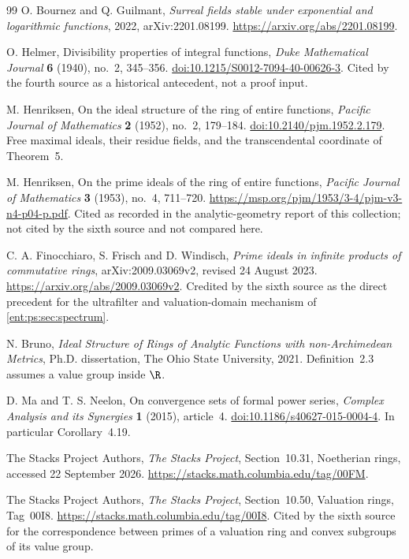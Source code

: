 \documentclass[11pt]{article}
\theoremstyle{plain}
\theoremstyle{plain}
\theoremstyle{plain}
\theoremstyle{definition}
\theoremstyle{definition}
\theoremstyle{definition}
\theoremstyle{definition}
\theoremstyle{remark}
\begin{document}
\begin{thebibliography}{99}
O. Bournez and Q. Guilmant, \emph{Surreal fields stable under exponential and
logarithmic functions}, 2022, arXiv:2201.08199.
\url{https://arxiv.org/abs/2201.08199}.

O. Helmer, Divisibility properties of integral functions, \emph{Duke
Mathematical Journal} \textbf{6} (1940), no.~2, 345--356.
\href{https://doi.org/10.1215/S0012-7094-40-00626-3}{doi:10.1215/S0012-7094-40-00626-3}.
Cited by the fourth source as a historical antecedent, not a proof input.

M. Henriksen, On the ideal structure of the ring of entire functions,
\emph{Pacific Journal of Mathematics} \textbf{2} (1952), no.~2, 179--184.
\href{https://doi.org/10.2140/pjm.1952.2.179}{doi:10.2140/pjm.1952.2.179}.
Free maximal ideals, their residue fields, and the transcendental coordinate
of Theorem~5.

M. Henriksen, On the prime ideals of the ring of entire functions,
\emph{Pacific Journal of Mathematics} \textbf{3} (1953), no.~4, 711--720.
\url{https://msp.org/pjm/1953/3-4/pjm-v3-n4-p04-p.pdf}.
Cited as recorded in the analytic-geometry report of this collection; not
cited by the sixth source and not compared here.

C. A. Finocchiaro, S. Frisch and D. Windisch, \emph{Prime ideals in
infinite products of commutative rings}, arXiv:2009.03069v2, revised
24 August 2023. \url{https://arxiv.org/abs/2009.03069v2}.
Credited by the sixth source as the direct precedent for the ultrafilter and
valuation-domain mechanism of \cref{ent:ps:sec:spectrum}.

N. Bruno, \emph{Ideal Structure of Rings of Analytic Functions with
non-Archimedean Metrics}, Ph.D. dissertation, The Ohio State University,
2021. Definition~2.3 assumes a value group inside $\R$.

D. Ma and T. S. Neelon, On convergence sets of formal power series,
\emph{Complex Analysis and its Synergies} \textbf{1} (2015), article~4.
\href{https://doi.org/10.1186/s40627-015-0004-4}{doi:10.1186/s40627-015-0004-4}.
In particular Corollary~4.19.

The Stacks Project Authors, \emph{The Stacks Project}, Section~10.31,
Noetherian rings, accessed 22 September 2026.
\url{https://stacks.math.columbia.edu/tag/00FM}.

The Stacks Project Authors, \emph{The Stacks Project}, Section~10.50,
Valuation rings, Tag~00I8. \url{https://stacks.math.columbia.edu/tag/00I8}.
Cited by the sixth source for the correspondence between primes of a
valuation ring and convex subgroups of its value group.


\end{thebibliography}
\end{document}
